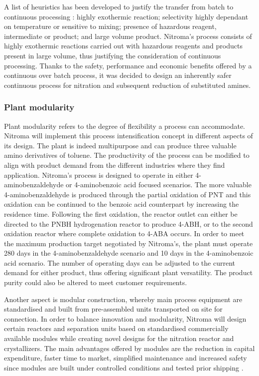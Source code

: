 A list of heuristics has been developed to justify the transfer from batch to continuous processing \cite{randall_process_2020}: highly exothermic reaction; selectivity highly dependant on temperature or sensitive to mixing; presence of hazardous reagent, intermediate or product; and large volume product.
Nitroma's process consists of highly exothermic reactions carried out with hazardous reagents and products present in large volume, thus justifying the consideration of continuous processing. Thanks to the safety, performance and economic benefits offered by a continuous over batch process, it was decided to design an inherently safer continuous process for nitration and subsequent reduction of substituted amines.

\subsubsection{Plant modularity} 

Plant modularity refers to the degree of flexibility a process can accommodate. Nitroma will implement this process intensification concept in different aspects of its design. The plant is indeed multipurpose and can produce three valuable amino derivatives of toluene. The productivity of the process can be modified to align with product demand from the different industries where they find application. Nitroma's process is designed to operate in either 4-aminobenzaldehyde or 4-aminobenzoic acid focused scenarios. The more valuable 4-aminobenzaldehyde is produced through the partial oxidation of PNT and this oxidation can be continued to the benzoic acid counterpart by increasing the residence time. Following the first oxidation, the reactor outlet can either be directed to the PNBH hydrogenation reactor to produce 4-ABH, or to the second oxidation reactor where complete oxidation to 4-ABA occurs. In order to meet the maximum production target negotiated by Nitroma's, the plant must operate 280 days in the 4-aminobenzaldehyde scenario and 10 days in the 4-aminobenzoic acid scenario. The number of operating days can be adjusted to the current demand for either product, thus offering significant plant versatility. The product purity could also be altered to meet customer requirements.

Another aspect is modular construction, whereby main process equipment are standardised and built from pre-assembled units transported on site for connection. In order to balance innovation and modularity, Nitroma will design certain reactors and separation units based on standardised commercially available modules while creating novel designs for the nitration reactor and crystallizers. The main advantages offered by modules are the reduction in capital expenditure, faster time to market, simplified maintenance and increased safety since modules are built under controlled conditions and tested prior shipping \cite{baldea_modular_2017}.


